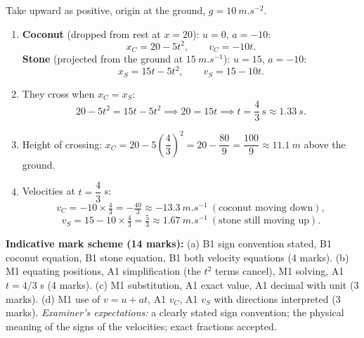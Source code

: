 \documentclass[11pt]{article}
\begin{document}
\begin{corrige}
Take upward as positive, origin at the ground, $g = \SI{10}{m.s^{-2}}$.
\begin{enumerate}
\item \textbf{Coconut} (dropped from rest at $x = 20$): $u = 0$, $a = -10$:
\[
x_C = 20 - 5t^2, \qquad v_C = -10t.
\]
\textbf{Stone} (projected from the ground at $\SI{15}{m.s^{-1}}$): $u = 15$, $a = -10$:
\[
x_S = 15t - 5t^2, \qquad v_S = 15 - 10t.
\]
\item They cross when $x_C = x_S$:
\[
20 - 5t^2 = 15t - 5t^2 \implies 20 = 15t \implies t = \dfrac{4}{3}\ \mathrm{s} \approx \SI{1.33}{s}.
\]
\item Height of crossing: $x_C = 20 - 5\left(\dfrac{4}{3}\right)^2 = 20 - \dfrac{80}{9} = \dfrac{100}{9} \approx \SI{11.1}{m}$ above the ground.
\item Velocities at $t = \dfrac{4}{3}$ s:
\[
v_C = -10\times\tfrac{4}{3} = -\tfrac{40}{3} \approx \SI{-13.3}{m.s^{-1}} \ (\text{coconut moving down}),
\]
\[
v_S = 15 - 10\times\tfrac{4}{3} = \tfrac{5}{3} \approx \SI{1.67}{m.s^{-1}} \ (\text{stone still moving up}).
\]
\end{enumerate}
\textbf{Indicative mark scheme (14 marks):} (a) B1 sign convention stated, B1 coconut equation, B1 stone equation, B1 both velocity equations (4 marks). (b) M1 equating positions, A1 simplification (the $t^2$ terms cancel), M1 solving, A1 $t = 4/3$ s (4 marks). (c) M1 substitution, A1 exact value, A1 decimal with unit (3 marks). (d) M1 use of $v = u + at$, A1 $v_C$, A1 $v_S$ with directions interpreted (3 marks). \emph{Examiner's expectations:} a clearly stated sign convention; the physical meaning of the signs of the velocities; exact fractions accepted.
\end{corrige}
\end{document}
